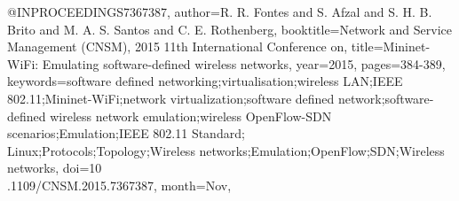 @INPROCEEDINGS{7367387, author={R. R. Fontes and S. Afzal and S. H. B. Brito and M. A. S. Santos and C. E. Rothenberg}, booktitle={Network and Service Management (CNSM), 2015 11th International Conference on}, title={Mininet-WiFi: Emulating software-defined wireless networks}, year={2015}, pages={384-389}, keywords={software defined networking;virtualisation;wireless LAN;IEEE 802.11;Mininet-WiFi;network virtualization;software defined network;software-defined wireless network emulation;wireless OpenFlow-SDN scenarios;Emulation;IEEE 802.11 Standard;\\Linux;Protocols;Topology;Wireless networks;Emulation;OpenFlow;SDN;Wireless networks}, doi={10\\.1109/CNSM.2015.7367387}, month={Nov},}